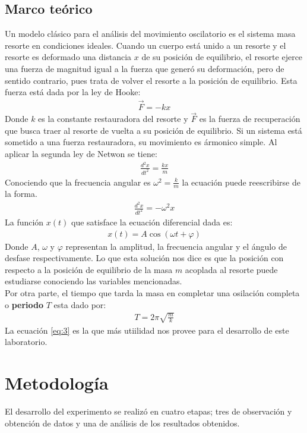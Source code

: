 \documentclass[spanish,notitlepage,letterpaper, 12pt]{article}
\begin{document}
\subsection{Marco teórico} \label{I.MT}
Un modelo clásico para el análisis del movimiento oscilatorio es el sistema masa resorte en condiciones ideales. Cuando un cuerpo está unido a un resorte y el resorte es deformado una distancia $x$ de su posición de equilibrio, el resorte ejerce una fuerza de magnitud igual a la fuerza que generó su deformación, pero de sentido contrario, pues trata de volver el resorte a la posición de equilibrio. Esta fuerza está dada por la ley de Hooke: 
\begin{align}\label{eq:1}
    \vec{F}=-kx
\end{align}
Donde $k$ es la constante restauradora del resorte y $\vec{F}$ es la fuerza de recuperación que busca traer al resorte de vuelta a su posición de equilibrio. Si un sistema está sometido a una fuerza restauradora, su movimiento es ármonico simple. Al aplicar la segunda ley de Netwon se tiene:
\begin{align}
    \frac{d^2x}{dt^2}=\frac{kx}{m}
\end{align}
Conociendo que la frecuencia angular es $\omega^2=\frac{k}{m}$ la ecuación puede reescribirse de la forma.
\begin{align}
    \frac{d^2x}{dt^2}=-\omega^2x
\end{align}
La función $x(t)$ que satisface la ecuación diferencial dada es: 
\begin{align}\label{eq:2}
    x(t)=A\cos{(\omega t + \varphi)}
\end{align}
Donde $A$, $\omega$ y $\varphi$ representan la amplitud, la frecuencia angular y el ángulo de desfase respectivamente. Lo que esta solución nos dice es que la posición con respecto a la posición de equilibrio de la masa $m$ acoplada al resorte puede estudiarse conociendo las variables mencionadas.\\

Por otra parte, el tiempo que tarda la masa en completar una osilación completa o \textbf{periodo} $T$ esta dado por: 
\begin{align}
    \label{eq:3}
    T=2\pi\sqrt{\frac{m}{k}}
\end{align}
La ecuación \eqref{eq:3} es la que más utiilidad nos provee para el desarrollo de este laboratorio.
\section{Metodología}
El desarrollo del experimento se realizó en cuatro etapas; tres de observación y obtención de datos y una de análisis de los resultados obtenidos.
\end{document}
